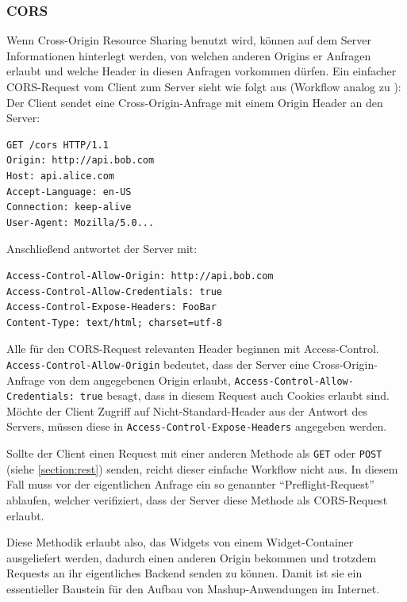 \subsubsection*{CORS}
Wenn Cross-Origin Resource Sharing benutzt wird, können auf dem Server Informationen hinterlegt werden, von welchen anderen Origins er Anfragen erlaubt und welche Header in diesen Anfragen vorkommen dürfen. Ein einfacher CORS-Request vom Client zum Server sieht wie folgt aus (Workflow analog zu \cite{Hossain2012}):
Der Client sendet eine Cross-Origin-Anfrage mit einem Origin Header an den Server:
\begin{lstlisting}
GET /cors HTTP/1.1
Origin: http://api.bob.com
Host: api.alice.com
Accept-Language: en-US
Connection: keep-alive
User-Agent: Mozilla/5.0...
\end{lstlisting}
Anschließend antwortet der Server mit:
\begin{lstlisting}
Access-Control-Allow-Origin: http://api.bob.com
Access-Control-Allow-Credentials: true
Access-Control-Expose-Headers: FooBar
Content-Type: text/html; charset=utf-8
\end{lstlisting}
Alle für den CORS-Request relevanten Header beginnen mit Access-Control. \texttt{Access\allowbreak -Control\allowbreak -Allow\allowbreak -Origin} bedeutet, dass der Server eine Cross-Origin-Anfrage von dem angegebenen Origin erlaubt, \texttt{Access\allowbreak -Control\allowbreak -Allow\allowbreak -Credentials: true} besagt, dass in diesem Request auch Cookies erlaubt sind. Möchte der Client Zugriff auf Nicht-Standard-Header aus der Antwort des Servers, müssen diese in \texttt{Access\allowbreak -Control\allowbreak -Expose\allowbreak -Headers} angegeben werden.

Sollte der Client einen Request mit einer anderen Methode als \texttt{GET} oder \texttt{POST} (siehe \ref{section:rest}) senden, reicht dieser einfache Workflow nicht aus. In diesem Fall muss vor der eigentlichen Anfrage ein so genannter "`Preflight-Request"' ablaufen, welcher verifiziert, dass der Server diese Methode als CORS-Request erlaubt.

Diese Methodik erlaubt also, das Widgets von einem Widget-Container ausgeliefert werden, dadurch einen anderen Origin bekommen und trotzdem Requests an ihr eigentliches Backend senden zu können. Damit ist sie ein essentieller Baustein für den Aufbau von Mashup-Anwendungen im Internet.

